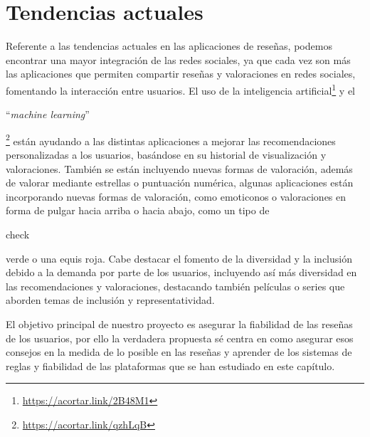 \section{Tendencias actuales}

Referente a las tendencias actuales en las aplicaciones de reseñas, podemos encontrar una mayor integración de las redes sociales, ya que cada vez son más las aplicaciones que permiten compartir reseñas y valoraciones en redes sociales, fomentando la interacción entre usuarios. El uso de la inteligencia artificial\footnote{\url{https://acortar.link/2B48M1}} y el \begin{otherlanguage}{english}``\textit{machine learning}''\end{otherlanguage} \cite{MachLear} \footnote{\url{https://acortar.link/qzhLqB}} están ayudando a las distintas aplicaciones a mejorar las recomendaciones personalizadas a los usuarios, basándose en su historial de visualización y valoraciones. También se están incluyendo nuevas formas de valoración, además de valorar mediante estrellas o puntuación numérica, algunas aplicaciones están incorporando nuevas formas de valoración, como emoticonos o valoraciones en forma de pulgar hacia arriba o hacia abajo, como un tipo de \begin{otherlanguage}{english}check \end{otherlanguage} verde o una equis roja. Cabe destacar el fomento de la diversidad y la inclusión debido a la demanda por parte de los usuarios, incluyendo así más diversidad en las recomendaciones y valoraciones, destacando también películas o series que aborden temas de inclusión y representatividad.

El objetivo principal de nuestro proyecto es asegurar la fiabilidad de las reseñas de los usuarios, por ello la verdadera propuesta sé centra en como asegurar esos consejos en la medida de lo posible en las reseñas y aprender de los sistemas de reglas y fiabilidad de las plataformas que se han estudiado en este capítulo. 



